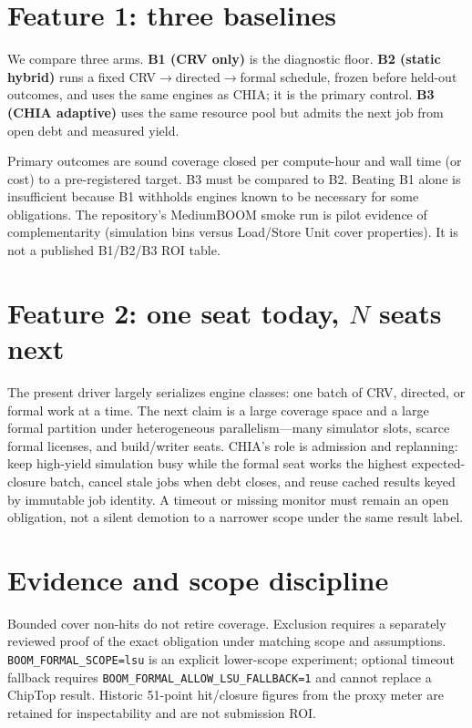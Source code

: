 \documentclass[conference,letterpaper]{IEEEtran}
\begin{document}
\section{Feature 1: three baselines}

We compare three arms. \textbf{B1 (CRV only)} is the diagnostic floor.
\textbf{B2 (static hybrid)} runs a fixed CRV$\rightarrow$directed$\rightarrow$formal
schedule, frozen before held-out outcomes, and uses the same engines as CHIA;
it is the primary control. \textbf{B3 (CHIA adaptive)} uses the same resource
pool but admits the next job from open debt and measured yield.

Primary outcomes are sound coverage closed per compute-hour and wall time (or
cost) to a pre-registered target. B3 must be compared to B2. Beating B1 alone
is insufficient because B1 withholds engines known to be necessary for some
obligations. The repository's MediumBOOM smoke run is pilot evidence of
complementarity (simulation bins versus Load/Store Unit cover properties). It
is not a published B1/B2/B3 ROI table.

\section{Feature 2: one seat today, \texorpdfstring{$N$}{N} seats next}

The present driver largely serializes engine classes: one batch of CRV,
directed, or formal work at a time. The next claim is a large coverage space
and a large formal partition under heterogeneous parallelism---many simulator
slots, scarce formal licenses, and build/writer seats. CHIA's role is
admission and replanning: keep high-yield simulation busy while the formal seat
works the highest expected-closure batch, cancel stale jobs when debt closes,
and reuse cached results keyed by immutable job identity. A timeout or missing
monitor must remain an open obligation, not a silent demotion to a narrower
scope under the same result label.

\section{Evidence and scope discipline}

Bounded cover non-hits do not retire coverage. Exclusion requires a separately
reviewed proof of the exact obligation under matching scope and assumptions.
\texttt{BOOM\_FORMAL\_SCOPE=lsu} is an explicit lower-scope experiment; optional
timeout fallback requires \texttt{BOOM\_FORMAL\_ALLOW\_LSU\_FALLBACK=1} and
cannot replace a ChipTop result. Historic 51-point hit/closure figures from the
proxy meter are retained for inspectability and are not submission ROI.
\end{document}
